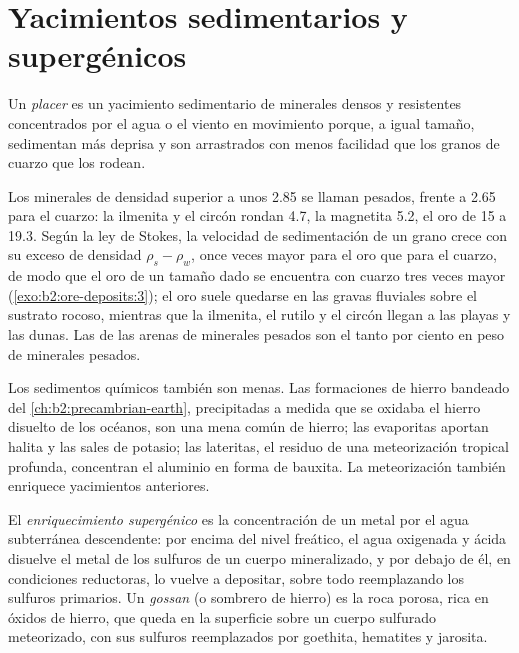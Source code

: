 \section{Yacimientos sedimentarios y supergénicos}\label{sec:b2:ore-deposits:sedimentary}

\begin{definition}[Placer]\label{def:b2:ore-deposits:placer}
Un \emph{placer} es un yacimiento sedimentario de minerales densos y resistentes concentrados por
el agua o el viento en movimiento porque, a igual tamaño, sedimentan más deprisa y son arrastrados con menos facilidad
que los granos de cuarzo que los rodean.
\end{definition}

Los minerales de densidad superior a unos 2.85 se llaman pesados, frente a 2.65 para el cuarzo: la ilmenita y el circón
rondan 4.7, la magnetita 5.2, el oro de 15 a 19.3. Según la ley de Stokes, la velocidad de sedimentación de un grano crece con
su exceso de densidad $\rho_s - \rho_w$, once veces mayor para el oro que para el cuarzo, de modo que el oro de un
tamaño dado se encuentra con cuarzo tres veces mayor (\cref{exo:b2:ore-deposits:3}); el oro
suele quedarse en las gravas fluviales sobre el sustrato rocoso, mientras que la ilmenita, el rutilo y el circón llegan a las playas y
las dunas. Las  de las arenas de minerales pesados son el tanto por ciento en peso de minerales pesados.

Los sedimentos químicos también son menas. Las formaciones de hierro bandeado del \cref{ch:b2:precambrian-earth},
precipitadas a medida que se oxidaba el hierro disuelto de los océanos, son una mena común de hierro; las evaporitas
aportan halita y las sales de potasio; las lateritas, el residuo de una meteorización tropical profunda,
concentran el aluminio en forma de bauxita. La meteorización también enriquece yacimientos anteriores.

\begin{definition}\label{def:b2:ore-deposits:supergene}
El \emph{enriquecimiento supergénico} es la concentración de un metal por
el agua subterránea descendente: por encima del nivel freático, el agua oxigenada y ácida disuelve el metal de los
sulfuros de un cuerpo mineralizado, y por debajo de él, en condiciones reductoras, lo vuelve a depositar, sobre todo
reemplazando los sulfuros primarios. Un \emph{gossan} (o sombrero de hierro) es la roca porosa, rica en óxidos de hierro,
que queda en la superficie sobre un cuerpo sulfurado meteorizado, con sus sulfuros reemplazados por goethita, hematites y
jarosita.
\end{definition}

